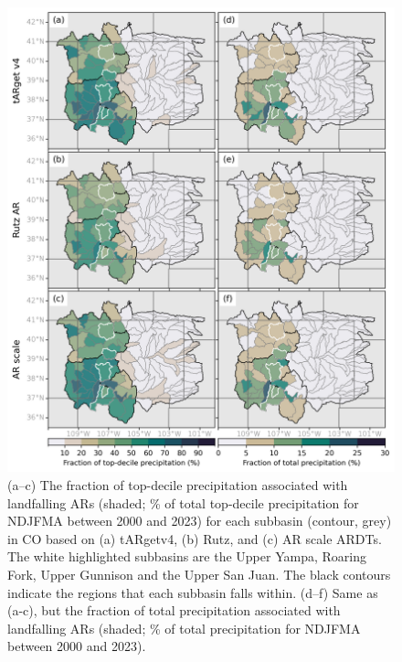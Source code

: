\documentclass[draft]{agujournal2019}
\begin{document}
\begin{figure}
\noindent\includegraphics[width=\textwidth, height=\textheight, keepaspectratio]{fig6.png}
\caption{(a–c) The fraction of top-decile precipitation associated with landfalling ARs (shaded; \% of total top-decile precipitation for NDJFMA between 2000 and 2023) for each subbasin (contour, grey) in CO based on (a) tARgetv4, (b) Rutz, and (c) AR scale ARDTs. The white highlighted subbasins are the Upper Yampa, Roaring Fork, Upper Gunnison and the Upper San Juan. The black contours indicate the regions that each subbasin falls within. (d–f) Same as (a-c), but the fraction of total precipitation associated with landfalling ARs (shaded; \% of total precipitation for NDJFMA between 2000 and 2023).}
\label{fig:choropleth}
\end{figure}
\end{document}
